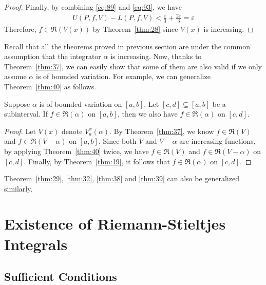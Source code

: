 \documentclass[thmcnt=section, 12pt]{my-elegantbook}
\begin{document}
\begin{proof}
    \par Finally, by combining \eqref{eq:89} and \eqref{eq:93}, we have
    \begin{align*}
        U(P,f,V) - L(P,f,V)
        < \frac{\varepsilon}{3} + \frac{2\varepsilon}{3}
        = \varepsilon
    \end{align*}
    Therefore, $f \in \mathfrak{R}(V(x))$ by Theorem~\ref{thm:28} since $V(x)$ is increasing.
\end{proof}


Recall that all the theorems proved in previous section
are under the common assumption that the integrator $\alpha$
is increasing.
Now, thanks to Theorem~\ref{thm:37},
we can easily show that some of them are also valid
if we only assume $\alpha$ is of bounded variation.
For example, we can generalize Theorem~\ref{thm:40} as follows.

\begin{theorem} \label{thm:80}
    Suppose $\alpha$ is of bounded variation on $[a, b]$.
    Let $[c, d] \subseteq [a, b]$ be a subinterval.
    If $f \in \mathfrak{R}(\alpha)$ on $[a, b]$,
    then we also have $f \in \mathfrak{R}(\alpha)$ on $[c, d]$.
\end{theorem}

\begin{proof}
    Let $V(x)$ denote $V_a^x (\alpha)$. By Theorem~\ref{thm:37},
    we know $f \in \mathfrak{R}(V)$
    and $f \in \mathfrak{R}(V - \alpha)$ on $[a, b]$.
    Since both $V$ and $V - \alpha$ are increasing functions,
    by applying Theorem~\ref{thm:40} twice,
    we have $f \in \mathfrak{R}(V)$
    and $f \in \mathfrak{R}(V - \alpha)$ on $[c, d]$.
    Finally, by Theorem~\ref{thm:19},
    it follows that $f \in \mathfrak{R}(\alpha)$ on $[c, d]$.
\end{proof}

Theorem~\ref{thm:29}, \ref{thm:32}, \ref{thm:38} and \ref{thm:39}
can also be generalized similarly.


\section{Existence of Riemann-Stieltjes Integrals}


\subsection{Sufficient Conditions}
\end{document}
